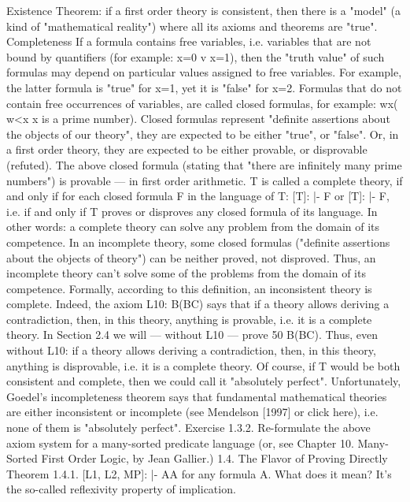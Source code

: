 Existence Theorem: if a first order theory is consistent, then there is a "model" (a kind of "mathematical
reality") where all its axioms and theorems are "true".
Completeness
If a formula contains free variables, i.e. variables that are not bound by quantifiers (for example: x=0 v
x=1), then the "truth value" of such formulas may depend on particular values assigned to free variables.
For example, the latter formula is "true" for x=1, yet it is "false" for x=2. Formulas that do not contain
free occurrences of variables, are called closed formulas, for example:
\forall w\exists x( w<x \AND  x is a prime number).
Closed formulas represent "definite assertions about the objects of our theory", they are expected to be
either "true", or "false". Or, in a first order theory, they are expected to be either provable, or disprovable
(refuted). The above closed formula (stating that "there are infinitely many prime numbers") is provable ---
in first order arithmetic.
T is called a complete theory, if and only if for each closed formula F in the language of T: [T]: |- F or
[T]: |- \neg F, i.e. if and only if T proves or disproves any closed formula of its language. In other words: a
complete theory can solve any problem from the domain of its competence.
In an incomplete theory, some closed formulas ("definite assertions about the objects of theory") can be
neither proved, not disproved. Thus, an incomplete theory can't solve some of the problems from the
domain of its competence.
Formally, according to this definition, an inconsistent theory is complete. Indeed, the axiom L10:
\neg B\IMPLIES (B\IMPLIES C) says that if a theory allows deriving a contradiction, then, in this theory, anything is
provable, i.e. it is a complete theory. In Section 2.4 we will --- without L10 --- prove 50%
\neg B\IMPLIES (B\IMPLIES \neg C). Thus, even without L10: if a theory allows deriving a contradiction, then, in this theory,
anything is disprovable, i.e. it is a complete theory.
Of course, if T would be both consistent and complete, then we could call it "absolutely perfect".
Unfortunately, Goedel's incompleteness theorem says that fundamental mathematical theories are
either inconsistent or incomplete (see Mendelson [1997] or click here), i.e. none of them is "absolutely
perfect".
Exercise 1.3.2. Re-formulate the above axiom system for a many-sorted predicate language (or, see
Chapter 10. Many-Sorted First Order Logic, by Jean Gallier.)
1.4. The Flavor of Proving Directly
Theorem 1.4.1. [L1, L2, MP]: |- A\IMPLIES A for any formula A. What does it mean? It's the so-called
reflexivity property of implication.
